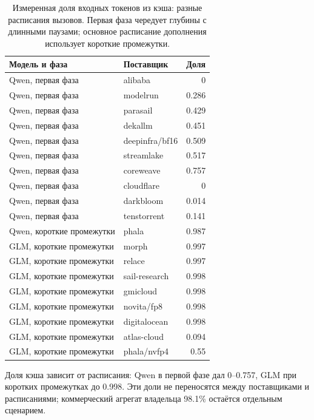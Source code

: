 \begin{table}[t]
\centering
\caption{Измеренная доля входных токенов из кэша: разные расписания вызовов.
Первая фаза чередует глубины с длинными паузами; основное расписание дополнения использует короткие промежутки.}
\label{tab:api-cache-cadence}
\footnotesize
\begin{tabular}{llr}
\toprule
Модель и фаза & Поставщик & Доля \\
\midrule
Qwen, первая фаза & alibaba & 0 \\
Qwen, первая фаза & modelrun & 0.286 \\
Qwen, первая фаза & parasail & 0.429 \\
Qwen, первая фаза & dekallm & 0.451 \\
Qwen, первая фаза & deepinfra/bf16 & 0.509 \\
Qwen, первая фаза & streamlake & 0.517 \\
Qwen, первая фаза & coreweave & 0.757 \\
Qwen, первая фаза & cloudflare & 0 \\
Qwen, первая фаза & darkbloom & 0.014 \\
Qwen, первая фаза & tenstorrent & 0.141 \\
Qwen, короткие промежутки & phala & 0.987 \\
GLM, короткие промежутки & morph & 0.997 \\
GLM, короткие промежутки & relace & 0.997 \\
GLM, короткие промежутки & sail-research & 0.998 \\
GLM, короткие промежутки & gmicloud & 0.998 \\
GLM, короткие промежутки & novita/fp8 & 0.998 \\
GLM, короткие промежутки & digitalocean & 0.998 \\
GLM, короткие промежутки & atlas-cloud & 0.094 \\
GLM, короткие промежутки & phala/nvfp4 & 0.55 \\
\bottomrule
\end{tabular}
\end{table}

Доля кэша зависит от расписания: Qwen в первой фазе дал 0--0.757, GLM при коротких промежутках до 0.998.
Эти доли не переносятся между поставщиками и расписаниями; коммерческий агрегат владельца 98.1\% остаётся отдельным сценарием.


